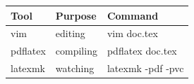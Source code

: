 \documentclass{article}
\begin{document}
\begin{tabular}{lll}
\toprule
Tool & Purpose & Command \\
\midrule
vim & editing & vim doc.tex \\
pdflatex & compiling & pdflatex doc.tex \\
latexmk & watching & latexmk -pdf -pvc \\
\bottomrule
\end{tabular}
\end{document}
